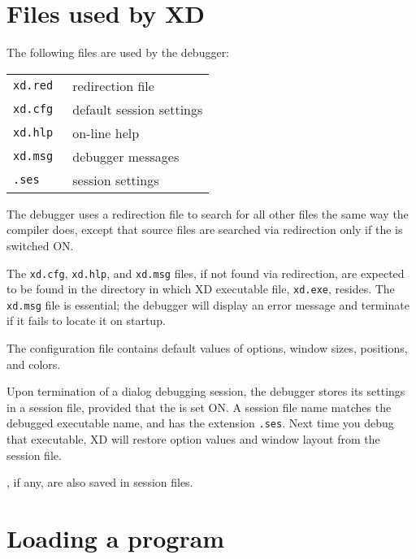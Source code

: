 
\section{Files used by XD}
\label{dialog:sysfiles}

The following files are used by the debugger:

\begin{tabular}{ll}
\tt xd.red & redirection file \\
\tt xd.cfg & default session settings \\
\tt xd.hlp & on-line help \\
\tt xd.msg & debugger messages \\
\tt *.ses  & session settings
\end{tabular}

The debugger uses a redirection file to search for all other files
the same way the compiler does, except that source files are searched via
redirection only if the 
is switched ON.

The \verb'xd.cfg', \verb'xd.hlp', and \verb'xd.msg' files, if not found via redirection,
are expected to be found in the directory in which XD executable file, \verb'xd.exe',
resides. The \verb'xd.msg' file is essential; the debugger will display an error message
and terminate if it fails to locate it on startup.

The configuration file contains default values of options, window sizes, positions,
and colors.


Upon termination of a dialog debugging session,
the debugger stores its settings in a session file, provided that
the 
is set ON. A session file name matches the debugged executable name,
and has the extension \verb'.ses'. Next time you debug that
executable, XD will restore option values and window layout from
the session file.


, if any, are also saved 
in session files.

\section{Loading a program}
\label{dialog:load}

